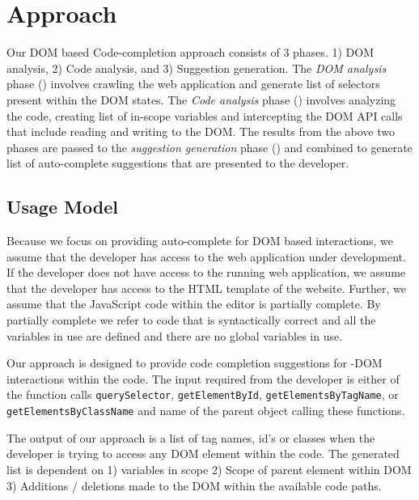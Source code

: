 \section{Approach}
\label{Sec:Approach}

	Our DOM based Code-completion approach consists of 3 phases. 1) DOM analysis, 2) Code analysis, and 3) Suggestion generation. The \emph{DOM analysis} phase () involves crawling the web application and generate list of \css selectors present within the DOM states. The \emph{Code analysis} phase () involves analyzing the \javascript code, creating list of in-scope variables and intercepting the DOM API calls that include reading and writing to the DOM. The results from the above two phases are passed to the \emph{suggestion generation} phase () and combined to generate list of auto-complete suggestions that are presented to the developer.
	
	\subsection{Usage Model}
	\label{Sec:Model}
		Because we focus on providing auto-complete for DOM based interactions, we assume that the developer has access to the web application under development. If the developer does not have access to the running web application, we assume that the developer has access to the HTML template of the website. Further, we assume that the JavaScript code within the editor is partially complete. By partially complete we refer to \javascript code that is syntactically correct and all the variables in use are defined and there are no global variables in use.
		
		Our approach is designed to provide code completion suggestions for \javascript-DOM interactions within the \javascript code. The input required from the developer is either of the function calls \texttt{querySelector}, \texttt{getElementById}, \texttt{getElementsByTagName}, or \texttt{getElementsByClassName} and name of the parent object calling these functions.
	
	
		The output of our approach is a list of tag names, id's or classes when the developer is trying to access any DOM element within the \javascript code. The generated list is dependent on 1) \javascript variables in scope 2) Scope of parent element within DOM 3) Additions / deletions made to the DOM within the available code paths.
	
